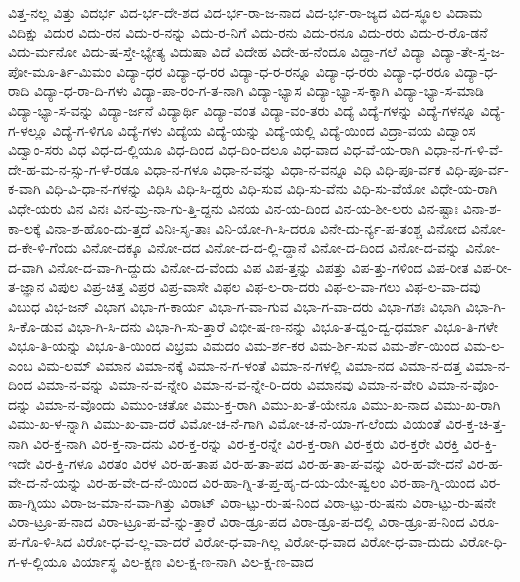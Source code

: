 {ವಿತ್ತ-ನಲ್ಲ
ವಿತ್ತು
ವಿದರ್ಭ
ವಿದ-ರ್ಭ-ದೇ-ಶದ
ವಿದ-ರ್ಭ-ರಾ-ಜ-ನಾದ
ವಿದ-ರ್ಭ-ರಾ-ಜ್ಯದ
ವಿದ-ಸ್ಥೂಲ
ವಿದಾಮ
ವಿದಿಕ್ಷು
ವಿದುರ
ವಿದು-ರನ
ವಿದು-ರ-ನನ್ನು
ವಿದು-ರ-ನಿಗೆ
ವಿದು-ರನು
ವಿದು-ರನೂ
ವಿದು-ರರು
ವಿದು-ರ-ರೊ-ಡನೆ
ವಿದು-ರ್ಮನೋ
ವಿದು-ಷ-ಸ್ತೇ-ಭ್ಯೇತ್ಯ
ವಿದುಷಾ
ವಿದೆ
ವಿದೇಹ
ವಿದೇ-ಹ-ನೆಂದೂ
ವಿದ್ದಾ-ಗಲೆ
ವಿದ್ಯಾ
ವಿದ್ಯಾ-ತೇ-ಸ್ತ-ಜ-ಪೋ-ಮೂ-ರ್ತಿ-ಮಿಮಂ
ವಿದ್ಯಾ-ಧರ
ವಿದ್ಯಾ-ಧ-ರರ
ವಿದ್ಯಾ-ಧ-ರ-ರನ್ನೂ
ವಿದ್ಯಾ-ಧ-ರರು
ವಿದ್ಯಾ-ಧ-ರರೂ
ವಿದ್ಯಾ-ಧ-ರಾದಿ
ವಿದ್ಯಾ-ಧ-ರಾ-ದಿ-ಗಳು
ವಿದ್ಯಾ-ಪಾ-ರಂ-ಗ-ತ-ನಾಗಿ
ವಿದ್ಯಾ-ಭ್ಯಾಸ
ವಿದ್ಯಾ-ಭ್ಯಾ-ಸ-ಕ್ಕಾಗಿ
ವಿದ್ಯಾ-ಭ್ಯಾ-ಸ-ಮಾಡಿ
ವಿದ್ಯಾ-ಭ್ಯಾ-ಸ-ವನ್ನು
ವಿದ್ಯಾ-ರ್ಜನೆ
ವಿದ್ಯಾರ್ಥಿ
ವಿದ್ಯಾ-ವಂತ
ವಿದ್ಯಾ-ವಂ-ತರು
ವಿದ್ಯೆ
ವಿದ್ಯೆ-ಗಳನ್ನು
ವಿದ್ಯೆ-ಗಳನ್ನೂ
ವಿದ್ಯೆ-ಗ-ಳಲ್ಲೂ
ವಿದ್ಯೆ-ಗ-ಳಿಗೂ
ವಿದ್ಯೆ-ಗಳು
ವಿದ್ಯೆಯ
ವಿದ್ಯೆ-ಯನ್ನು
ವಿದ್ಯೆ-ಯಲ್ಲಿ
ವಿದ್ಯೆ-ಯಿಂದ
ವಿದ್ರಾ-ವಯ
ವಿದ್ವಾಂಸ
ವಿದ್ವಾಂ-ಸರು
ವಿಧ
ವಿಧ-ದ-ಲ್ಲಿಯೂ
ವಿಧ-ದಿಂದ
ವಿಧ-ದಿಂ-ದಲೂ
ವಿಧ-ವಾದ
ವಿಧ-ವೆ-ಯ-ರಾಗಿ
ವಿಧಾ-ನ-ಗ-ಳಿ-ವೆ-ದೇ-ಹ-ಮ-ನ-ಸ್ಸು-ಗ-ಳೆ-ರಡೂ
ವಿಧಾ-ನ-ಗಳೂ
ವಿಧಾ-ನ-ವನ್ನು
ವಿಧಾ-ನ-ವನ್ನೂ
ವಿಧಿ
ವಿಧಿ-ಪೂ-ರ್ವಕ
ವಿಧಿ-ಪೂ-ರ್ವ-ಕ-ವಾಗಿ
ವಿಧಿ-ವಿ-ಧಾ-ನ-ಗಳನ್ನು
ವಿಧಿಸಿ
ವಿಧಿ-ಸಿ-ದ್ದರು
ವಿಧಿ-ಸುವ
ವಿಧಿ-ಸು-ವೆನು
ವಿಧಿ-ಸು-ವೆಯೋ
ವಿಧೇ-ಯ-ರಾಗಿ
ವಿಧೇ-ಯರು
ವಿನ
ವಿನಃ
ವಿನ-ಮ್ರ-ನಾ-ಗು-ತ್ತಿ-ದ್ದನು
ವಿನಯ
ವಿನ-ಯ-ದಿಂದ
ವಿನ-ಯ-ಶೀ-ಲರು
ವಿನ-ಷ್ಟಾಃ
ವಿನಾ-ಶ-ಕಾ-ಲಕ್ಕೆ
ವಿನಾ-ಶ-ಹೊಂ-ದು-ತ್ತದೆ
ವಿನಿಃ-ಸೃ-ತಾಃ
ವಿನಿ-ಯೋ-ಗಿ-ಸಿ-ದರೂ
ವಿನೇ-ದು-ರ್ನ್ಯ-ಪ-ತಂಶ್ಚ
ವಿನೋದ
ವಿನೋ-ದ-ಕೇ-ಳಿ-ಗೆಂದು
ವಿನೋ-ದಕ್ಕೂ
ವಿನೋ-ದದ
ವಿನೋ-ದ-ದ-ಲ್ಲಿ-ದ್ದಾನೆ
ವಿನೋ-ದ-ದಿಂದ
ವಿನೋ-ದ-ವನ್ನು
ವಿನೋ-ದ-ವಾಗಿ
ವಿನೋ-ದ-ವಾ-ಗಿ-ದ್ದುದು
ವಿನೋ-ದ-ವೆಂದು
ವಿಪ
ವಿಪ-ತ್ತನ್ನು
ವಿಪತ್ತು
ವಿಪ-ತ್ತು-ಗಳಿಂದ
ವಿಪ-ರೀತ
ವಿಪ-ರೀ-ತ-ಜ್ಞಾನ
ವಿಪುಲ
ವಿಪ್ರ-ಚಿತ್ತ
ವಿಪ್ರರ
ವಿಪ್ರ-ವಾಸೇ
ವಿಫಲ
ವಿಫ-ಲ-ರಾ-ದರು
ವಿಫ-ಲ-ವಾ-ಗಲು
ವಿಫ-ಲ-ವಾ-ದವು
ವಿಬುಧ
ವಿಭ-ಜನ್
ವಿಭಾಗ
ವಿಭಾ-ಗ-ಕಾರ್ಯ
ವಿಭಾ-ಗ-ವಾ-ಗುವ
ವಿಭಾ-ಗ-ವಾ-ದರು
ವಿಭಾ-ಗಶಃ
ವಿಭಾಗಿ
ವಿಭಾ-ಗಿ-ಸಿ-ಕೊ-ಡುವ
ವಿಭಾ-ಗಿ-ಸಿ-ದನು
ವಿಭಾ-ಗಿ-ಸು-ತ್ತಾರೆ
ವಿಭೀ-ಷ-ಣ-ನನ್ನು
ವಿಭೂ-ತ-ದ್ವಂ-ದ್ವ-ಧರ್ಮಾ
ವಿಭೂ-ತಿ-ಗಳೇ
ವಿಭೂ-ತಿ-ಯನ್ನು
ವಿಭೂ-ತಿ-ಯಿಂದ
ವಿಭ್ರಮ
ವಿಮದಂ
ವಿಮ-ರ್ಶ-ಕರ
ವಿಮ-ರ್ಶಿ-ಸುವ
ವಿಮ-ರ್ಶೆ-ಯಿಂದ
ವಿಮ-ಲ-ಎಂಬ
ವಿಮ-ಲಮ್
ವಿಮಾನ
ವಿಮಾ-ನಕ್ಕೆ
ವಿಮಾ-ನ-ಗ-ಳಂತೆ
ವಿಮಾ-ನ-ಗಳಲ್ಲಿ
ವಿಮಾ-ನದ
ವಿಮಾ-ನ-ದತ್ತ
ವಿಮಾ-ನ-ದಿಂದ
ವಿಮಾ-ನ-ವನ್ನು
ವಿಮಾ-ನ-ವ-ನ್ನೇರಿ
ವಿಮಾ-ನ-ವ-ನ್ನೇ-ರಿ-ದರು
ವಿಮಾನವು
ವಿಮಾ-ನ-ವೇರಿ
ವಿಮಾ-ನ-ವೊಂ-ದನ್ನು
ವಿಮಾ-ನ-ವೊಂದು
ವಿಮುಂ-ಚತೋ
ವಿಮು-ಕ್ತ-ರಾಗಿ
ವಿಮು-ಖ-ತೆ-ಯೇನೂ
ವಿಮು-ಖ-ನಾದ
ವಿಮು-ಖ-ರಾಗಿ
ವಿಮು-ಖ-ಳ-ನ್ನಾಗಿ
ವಿಮು-ಖ-ವಾ-ದರೆ
ವಿಮೋ-ಚ-ನೆ-ಗಾಗಿ
ವಿಮೋ-ಚ-ನೆ-ಯಾ-ಗ-ಲೆಂದು
ವಿಯಂತೆ
ವಿರ-ಕ್ತ-ಚಿ-ತ್ತ-ನಾಗಿ
ವಿರ-ಕ್ತ-ನಾಗಿ
ವಿರ-ಕ್ತ-ನಾ-ದನು
ವಿರ-ಕ್ತ-ರನ್ನು
ವಿರ-ಕ್ತ-ರನ್ನೇ
ವಿರ-ಕ್ತ-ರಾಗಿ
ವಿರ-ಕ್ತರು
ವಿರ-ಕ್ತರೇ
ವಿರಕ್ತಿ
ವಿರ-ಕ್ತಿ-ಇದೇ
ವಿರ-ಕ್ತಿ-ಗಳೂ
ವಿರತಂ
ವಿರಳ
ವಿರ-ಹ-ತಾಪ
ವಿರ-ಹ-ತಾ-ಪದ
ವಿರ-ಹ-ತಾ-ಪ-ವನ್ನು
ವಿರ-ಹ-ವೇ-ದನೆ
ವಿರ-ಹ-ವೇ-ದ-ನೆ-ಯನ್ನು
ವಿರ-ಹ-ವೇ-ದ-ನೆ-ಯಿಂದ
ವಿರ-ಹಾ-ಗ್ನಿ-ತ-ಪ್ತ-ಹೃ-ದ-ಯ-ಯೇ-ಷ್ವಲಂ
ವಿರ-ಹಾ-ಗ್ನಿ-ಯಿಂದ
ವಿರ-ಹಾ-ಗ್ನಿಯು
ವಿರಾ-ಜ-ಮಾ-ನ-ವಾ-ಗಿತ್ತು
ವಿರಾಟ್
ವಿರಾ-ಟ್ಪು-ರು-ಷ-ನಿಂದ
ವಿರಾ-ಟ್ಪು-ರು-ಷನು
ವಿರಾ-ಟ್ಪು-ರು-ಷನೇ
ವಿರಾ-ಟ್ರೂ-ಪ-ನಾದ
ವಿರಾ-ಟ್ರೂ-ಪ-ವೆ-ನ್ನು-ತ್ತಾರೆ
ವಿರಾ-ಡ್ರೂ-ಪದ
ವಿರಾ-ಡ್ರೂ-ಪ-ದಲ್ಲಿ
ವಿರಾ-ಡ್ರೂ-ಪ-ನಿಂದ
ವಿರೂ-ಪ-ಗೊ-ಳಿ-ಸಿದ
ವಿರೋ-ಧ-ವ-ಲ್ಲ-ವಾ-ದರೆ
ವಿರೋ-ಧ-ವಾ-ಗಿಲ್ಲ
ವಿರೋ-ಧ-ವಾದ
ವಿರೋ-ಧ-ವಾ-ದುದು
ವಿರೋ-ಧಿ-ಗ-ಳ-ಲ್ಲಿಯೂ
ವಿರ್ಯಾಸ್ಥ
ವಿಲ-ಕ್ಷಣ
ವಿಲ-ಕ್ಷ-ಣ-ನಾಗಿ
ವಿಲ-ಕ್ಷ-ಣ-ವಾದ
}
